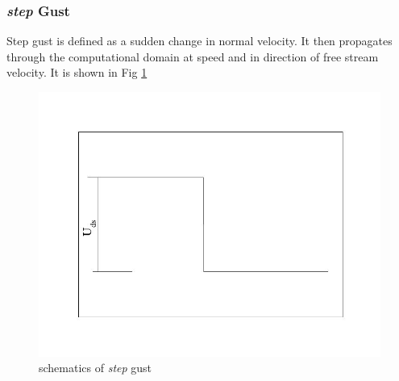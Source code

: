 \subsubsection{\emph{step} Gust}
Step gust is defined as a sudden change in normal velocity. It then propagates through the computational domain 
at speed and in direction of free stream velocity.
It is shown in Fig \ref{step}
\begin{figure}[htbp]
  \centering\includegraphics[clip,width=.5\textwidth]{Figures/step.jpg}
\caption{schematics of \emph{step} gust}\label{step}
\end{figure}

